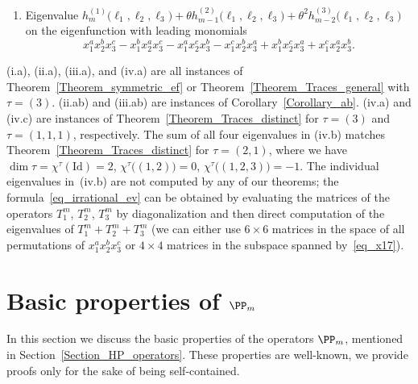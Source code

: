 \begin{enumerate}[label=(\roman*)]
\begin{enumerate}
\begin{multline}
      h_{m-2}\left(  \ell_{1},\ell_{2},\ell_{3}\right)  \sqrt{4\left(  \ell_{1}^{2}+\ell_{2}^{2}+\ell_{3}^{2}\right)  -4\left(  \ell_{1}\ell_{2}+\ell_{1}\ell_{3}+\ell_{2}\ell_{3}\right)  -3\theta^{2}}
   \end{multline}
     on four eigenfunctions with leading monomials in the space spanned by
    \begin{equation}
    \label{eq_x17}
    x_1^a x_2^b x_3^c-x_1^b x_2^c x_3^a,\quad x_1^a x_2^b x_3^c-x_1^c x_2^a x_3^b,\quad x_1^b x_2^a x_3^c-x_1^a x_2^c x_3^b,\quad x_1^b x_2^a x_3^c-x_1^c x_2^b x_3^a.
    \end{equation}
    \item Eigenvalue $h^{(1)}_m\bigl(\ell_1,\ell_2,\ell_3\bigr)+\theta h^{(2)}_{m-1}\bigl(\ell_1,\ell_2,\ell_3\bigr)+\theta^2  h^{(3)}_{m-2}\bigl(\ell_1,\ell_2,\ell_3\bigr)$ on the eigenfunction with leading monomials
     $$x_1^a x_2^b x_3^c -x_1^b x_2^a x_3^c-x_1^a x_2^c x_3^b-x_1^c x_2^b x_3^a+x_1^b x_2^c x_3^a+x_1^c x_2^a x_3^b.$$
   \end{enumerate}
\end{enumerate}

(i.a), (ii.a), (iii.a), and (iv.a) are all instances of Theorem~\ref{Theorem_symmetric_ef} or Theorem~\ref{Theorem_Traces_general} with $\tau=(3)$. (ii.ab) and (iii.ab) are instances of Corollary~\ref{Corollary_ab}. (iv.a) and (iv.c) are instances of Theorem~\ref{Theorem_Traces_distinct} for $\tau=(3)$ and $\tau=(1,1,1)$, respectively. The sum of all four eigenvalues in (iv.b) matches Theorem~\ref{Theorem_Traces_distinct} for $\tau=(2,1)$, where we have $\dim\tau=\chi^{\tau}(\mathrm{Id})=2$, $\chi^{\tau}\bigl( (1,2)\bigr)=0$, $\chi^{\tau}\bigl( (1,2,3)\bigr)=-1$. The individual eigenvalues in~(iv.b) are not computed by any of our theorems; the formula~\eqref{eq_irrational_ev} can be obtained by evaluating the matrices of the operators $T_1^m$, $T_2^m$, $T_3^m$ by diagonalization and then direct computation of the eigenvalues of $T_1^m+T_2^m+T_3^m$ (we can either use $6\times 6$ matrices in the space of all permutations of $x_1^a x_2^b x_3^c$ or $4\times 4$ matrices in the subspace spanned by~\eqref{eq_x17}).

\appendix

\section{Basic properties of \texorpdfstring{$\PP_m$}{Pm}}
\label{Section_appendix}

In this section we discuss the basic properties of the operators $\PP_m$, mentioned in Section~\ref{Section_HP_operators}. These properties are well-known, we provide proofs only for the sake of being self-contained.

